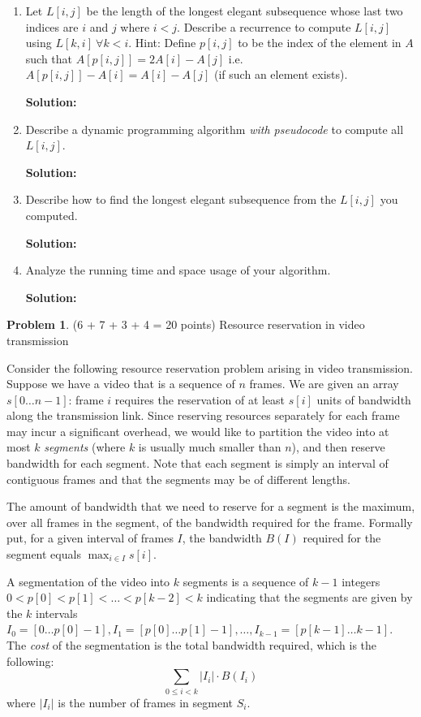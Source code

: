 \documentclass[11pt]{article}
\theoremstyle{definition}
\theoremstyle{theorem}
\newtheorem{prob}{Problem}
\newcommand{\solution}[1]{{\medskip\noindent\color{DarkBlue}\textbf{Solution:} {#1}}}
\newcommand{\solution}[1]{}
\begin{document}
\begin{enumerate}[label=(\alph*)]
	\item Let $L[i,j]$ be the length of the longest elegant subsequence whose last two indices are $i$ and $j$ where $i<j$. Describe a recurrence to compute $L[i,j]$ using $L[k,i]~\forall k<i$. Hint: Define $p[i,j]$ to be the index of the element in $A$ such that $A[p[i,j]] = 2A[i] - A[j]$ i.e. $A[p[i,j]] -A[i] = A[i] - A[j]$ (if such an element exists).
	
	\solution{
	}
	
	\item Describe a dynamic programming algorithm {\em with pseudocode} to compute all $L[i,j]$.
	
	\solution{
}
	\item Describe how to find the longest elegant subsequence from the $L[i,j]$ you computed.
	
	\solution{
	}

	\item Analyze the running time and space usage of your algorithm.
	
	\solution{
	}
\end{enumerate}

\newpage

\begin{prob}
	(6 + 7 + 3 + 4 = 20 points) Resource reservation in video transmission
\end{prob}

Consider the following resource reservation problem arising in video
transmission.  Suppose we have a video that is a sequence of $n$
frames.  We are given an array $s[0\ldots n-1]$: frame $i$ requires
the reservation of at least $s[i]$ units of bandwidth along the
transmission link.  Since reserving resources separately for each
frame may incur a significant overhead, we would like to partition the
video into at most $k$ {\em segments}\/ (where $k$ is usually much
smaller than $n$), and then reserve bandwidth for each segment.  Note
that each segment is simply an interval of contiguous frames and that
the segments may be of different lengths.

The amount of bandwidth that we need to reserve for a segment is the
maximum, over all frames in the segment, of the bandwidth required for
the frame.  Formally put, for a given interval of frames $I$, the
bandwidth $B(I)$ required for the segment equals $\max_{i \in I}
s[i]$.

A segmentation of the video into $k$ segments is a sequence of $k-1$
integers $0 < p[0] < p[1] < \ldots < p[k-2] < k$ indicating that the
segments are given by the $k$ intervals $I_0 = [0\ldots p[0]-1], I_1 =
[p[0] \ldots p[1]-1], \ldots, I_{k-1} = [p[k-1]\ldots k-1]$.  The {\em
	cost\/} of the segmentation is the total bandwidth required, which
is the following:
\[
\sum_{0 \le i < k} |I_i| \cdot B(I_i)
\]
where $|I_i|$ is the number of frames in segment $S_i$.
\end{document}
